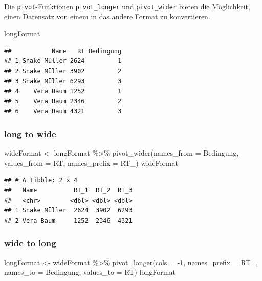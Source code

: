 \documentclass[
]{book}
\newenvironment{Shaded}{\begin{snugshade}}{\end{snugshade}}
\newcommand{\AttributeTok}[1]{\textcolor[rgb]{0.77,0.63,0.00}{#1}}
\newcommand{\DecValTok}[1]{\textcolor[rgb]{0.00,0.00,0.81}{#1}}
\newcommand{\FunctionTok}[1]{\textcolor[rgb]{0.00,0.00,0.00}{#1}}
\newcommand{\NormalTok}[1]{#1}
\newcommand{\OtherTok}[1]{\textcolor[rgb]{0.56,0.35,0.01}{#1}}
\newcommand{\SpecialCharTok}[1]{\textcolor[rgb]{0.00,0.00,0.00}{#1}}
\newcommand{\StringTok}[1]{\textcolor[rgb]{0.31,0.60,0.02}{#1}}
\begin{document}
Die \texttt{pivot}-Funktionen \texttt{pivot\_longer} und \texttt{pivot\_wider} bieten die Möglichkeit, einen Datensatz von einem in das andere Format zu konvertieren.

\begin{Shaded}
\begin{Highlighting}[]
\NormalTok{longFormat}
\end{Highlighting}
\end{Shaded}

\begin{verbatim}
##           Name   RT Bedingung
## 1 Snake Müller 2624         1
## 2 Snake Müller 3902         2
## 3 Snake Müller 6293         3
## 4    Vera Baum 1252         1
## 5    Vera Baum 2346         2
## 6    Vera Baum 4321         3
\end{verbatim}

\hypertarget{long-to-wide}{%
\subsubsection{long to wide}\label{long-to-wide}}

\begin{Shaded}
\begin{Highlighting}[]
\NormalTok{wideFormat }\OtherTok{\textless{}{-}}\NormalTok{ longFormat }\SpecialCharTok{\%\textgreater{}\%}
  \FunctionTok{pivot\_wider}\NormalTok{(}\AttributeTok{names\_from =} \StringTok{\textquotesingle{}Bedingung\textquotesingle{}}\NormalTok{,}
              \AttributeTok{values\_from =} \StringTok{\textquotesingle{}RT\textquotesingle{}}\NormalTok{,}
              \AttributeTok{names\_prefix =} \StringTok{\textquotesingle{}RT\_\textquotesingle{}}\NormalTok{)}
\NormalTok{wideFormat}
\end{Highlighting}
\end{Shaded}

\begin{verbatim}
## # A tibble: 2 x 4
##   Name          RT_1  RT_2  RT_3
##   <chr>        <dbl> <dbl> <dbl>
## 1 Snake Müller  2624  3902  6293
## 2 Vera Baum     1252  2346  4321
\end{verbatim}

\hypertarget{wide-to-long}{%
\subsubsection{wide to long}\label{wide-to-long}}

\begin{Shaded}
\begin{Highlighting}[]
\NormalTok{longFormat }\OtherTok{\textless{}{-}}\NormalTok{ wideFormat }\SpecialCharTok{\%\textgreater{}\%}
  \FunctionTok{pivot\_longer}\NormalTok{(}\AttributeTok{cols =} \SpecialCharTok{{-}}\DecValTok{1}\NormalTok{,}
               \AttributeTok{names\_prefix =} \StringTok{\textquotesingle{}RT\_\textquotesingle{}}\NormalTok{,}
               \AttributeTok{names\_to =} \StringTok{\textquotesingle{}Bedingung\textquotesingle{}}\NormalTok{,}
               \AttributeTok{values\_to =} \StringTok{\textquotesingle{}RT\textquotesingle{}}\NormalTok{)}
\NormalTok{longFormat}
\end{Highlighting}
\end{Shaded}
\end{document}
